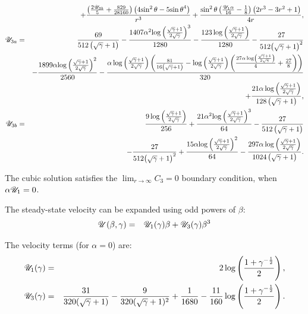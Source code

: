 \begin{eqnarray*}
\\ && + \frac{\left(\frac{2 {\mathscr{U}_{3b}}}{5} + \frac{829}{28160}\right) \left(4 {\sin^2\theta} - 5 {\sin\theta}^4\right)}{r^3} + \frac{{\sin^2\theta} \left(\frac{{\mathscr{U}_1}\alpha}{16} - \frac{1}{8}\right) \left(2 r^3 - 3 r^2 + 1\right)}{4 r},
\\
\mathscr{U}_{3a} &=& \frac{69}{512 \left(\sqrt{\gamma} + 1\right)} - \frac{1407\alpha^2 {\log\left(\frac{\sqrt{\gamma} + 1}{2 \sqrt{\gamma}}\right)}^3}{1280} - \frac{123 \log\left(\frac{\sqrt{\gamma} + 1}{2 \sqrt{\gamma}}\right)}{1280} - \frac{27}{512 {\left(\sqrt{\gamma} + 1\right)}^2} \\ && -
\frac{1899\alpha {\log\left(\frac{\sqrt{\gamma} + 1}{2 \sqrt{\gamma}}\right)}^2}{2560} - \frac{\alpha \log\left(\frac{\sqrt{\gamma} + 1}{2 \sqrt{\gamma}}\right) \left(\frac{81}{16 \left(\sqrt{\gamma} + 1\right)} - \log\left(\frac{\sqrt{\gamma} + 1}{2 \sqrt{\gamma}}\right) \left(\frac{27\alpha \log\left(\frac{\sqrt{\gamma} + 1}{2 \sqrt{\gamma}}\right)}{4} + \frac{27}{8}\right)\right)}{320} \\ && + 
\frac{21\alpha \log\left(\frac{\sqrt{\gamma} + 1}{2 \sqrt{\gamma}}\right)}{128 \left(\sqrt{\gamma} + 1\right)},
\\
\mathscr{U}_{3b} &=& \frac{9 \log\left(\frac{\sqrt{\gamma} + 1}{2 \sqrt{\gamma}}\right)}{256} + \frac{21\alpha^2 {\log\left(\frac{\sqrt{\gamma} + 1}{2 \sqrt{\gamma}}\right)}^3}{64} - \frac{27}{512 \left(\sqrt{\gamma} + 1\right)} 
\\ && 
- \frac{27}{512 {\left(\sqrt{\gamma} + 1\right)}^2} + \frac{15\alpha {\log\left(\frac{\sqrt{\gamma} + 1}{2 \sqrt{\gamma}}\right)}^2}{64} 
- \frac{297\alpha \log\left(\frac{\sqrt{\gamma} + 1}{2 \sqrt{\gamma}}\right)}{1024 \left(\sqrt{\gamma} + 1\right)}.
\end{eqnarray*}

The cubic solution satisfies the $\lim_{r\rightarrow\infty}C_3 = 0$ boundary condition, 
when $\alpha\mathscr{U}_1 = 0$.

The steady-state velocity can be expanded using odd powers of $\beta$:
\begin{eqnarray}
\mathscr{U}(\beta, \gamma) &=& \mathscr{U}_1(\gamma) \beta + \mathscr{U}_3(\gamma) \beta^3
\end{eqnarray}

The velocity terms (for $\alpha = 0$) are:
\begin{eqnarray}
\mathscr{U}_1(\gamma) &=& 2 \log \left(\frac{1 + \gamma^{-\frac{1}{2}}}{2}\right), \\
\mathscr{U}_3(\gamma) &=& \frac{31}{320(\sqrt\gamma + 1)} - \frac{9}{320(\sqrt\gamma + 1)^2} + \frac{1}{1680} - \frac{11}{160} \log \left(\frac{1 + \gamma^{-\frac{1}{2}}}{2}\right).
\end{eqnarray}

